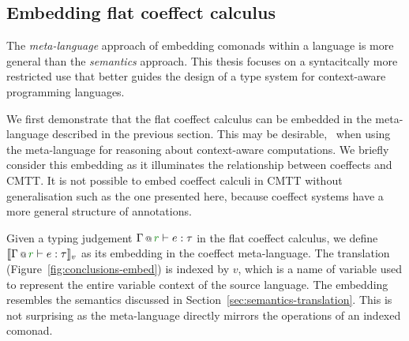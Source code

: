 
\subsection{Embedding flat coeffect calculus}

The \emph{meta-language} approach of embedding comonads within a language is more general than the
\emph{semantics} approach. This thesis focuses on a syntacitcally more restricted use that better
guides the design of a type system for context-aware programming languages.

We first demonstrate that the flat coeffect calculus can be embedded in the
meta-language described in the previous section. This may be desirable, \eg~when using the
meta-language for reasoning about context-aware computations. We briefly consider this embedding
as it illuminates the relationship between coeffects and CMTT. It is not possible to embed
coeffect calculi in CMTT without generalisation such as the one presented here, because coeffect
systems have a more general structure of annotations.

Given a typing judgement $\coctx{\Gamma}{\cclrd{r}} \vdash e : \tau$ in the flat coeffect calculus,
we define $\sem{\coctx{\Gamma}{\cclrd{r}} \vdash e : \tau}_v$ as its embedding in the coeffect
meta-language. The translation (Figure~\ref{fig:conclusions-embed}) is indexed by $v$, which is a name of variable used
to represent the entire variable context of the source language. The embedding resembles the semantics discussed in
Section~\ref{sec:semantics-translation}. This is not surprising as the meta-language directly mirrors
the operations of an indexed comonad.


